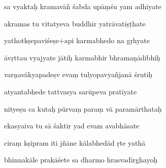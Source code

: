 \documentclass[article,12pt,a4paper]{memoir}%
\newcounter{parCount}
\begin{document}
	  
	  \pstart {} sa vyaktaḥ kramavāñ śabda upāṃśu yam adhīyate 
	{}
	\pend%
      

	  
	  \pstart \leavevmode%
	akramas tu vitatyeva buddhir yatrāvatiṣṭhate 
	{}
	\pend%
      

	  
	  \pstart {} yathotkṣepaviśeṣe+api karmabhedo na gṛhyate 
	{}
	\pend%
      

	  
	  \pstart \leavevmode%
	āvṛttau vyajyate jātiḥ karmabhir bhramaṇādibhiḥ 
	{}
	\pend%
      

	  
	  \pstart {} varṇavākyapadeṣv evaṃ tulyopavyañjanā śrutiḥ 
	{}
	\pend%
      

	  
	  \pstart \leavevmode%
	atyantabhede tattvasya sarūpeva pratīyate 
	{}
	\pend%
      

	  
	  \pstart {} nityeṣu ca kutaḥ pūrvaṃ paraṃ vā paramārthataḥ 
	{}
	\pend%
      

	  
	  \pstart \leavevmode%
	ekasyaiva tu sā śaktir yad evam avabhāsate 
	{}
	\pend%
      

	  
	  \pstart {} ciraṃ kṣipram iti jñāne kālabhedād ṛte yathā 
	{}
	\pend%
      

	  
	  \pstart \leavevmode%
	bhinnakāle prakāśete sa dharmo hrasvadīrghayoḥ 
	{}
	\pend%
      
\end{document}
